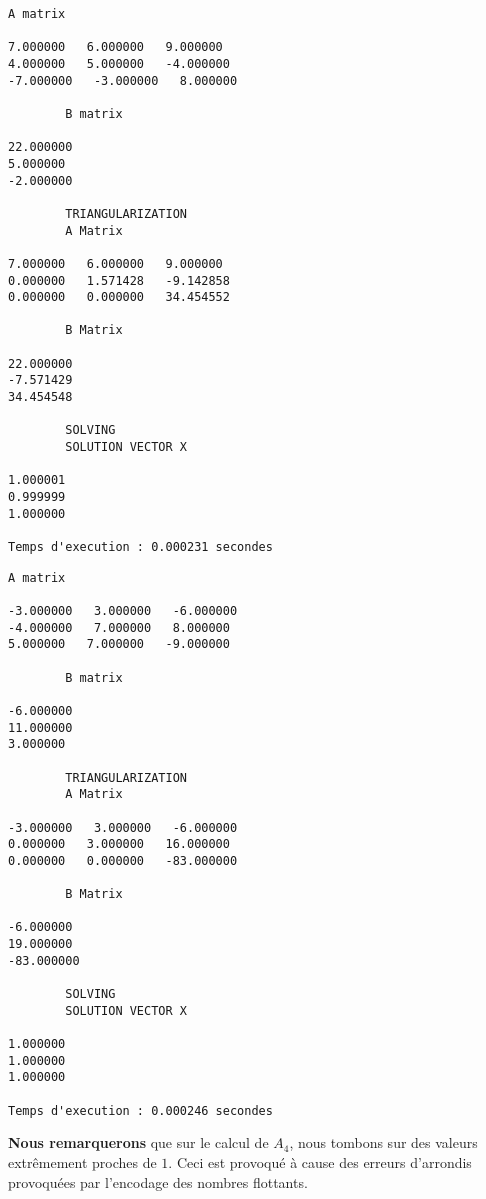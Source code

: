 \begin{lstlisting}[caption={$A_4X=B$} results, basicstyle=\fontsize{8}{10}\selectfont]
		A matrix 

7.000000   6.000000   9.000000   
4.000000   5.000000   -4.000000   
-7.000000   -3.000000   8.000000   

		B matrix 

22.000000   
5.000000   
-2.000000   

		TRIANGULARIZATION 
		A Matrix 

7.000000   6.000000   9.000000   
0.000000   1.571428   -9.142858   
0.000000   0.000000   34.454552   

		B Matrix 

22.000000   
-7.571429   
34.454548   

		SOLVING 
		SOLUTION VECTOR X 

1.000001   
0.999999   
1.000000   

Temps d'execution : 0.000231 secondes
\end{lstlisting}
\begin{lstlisting}[caption={$A_6X=B$} results, basicstyle=\fontsize{8}{10}\selectfont]
		A matrix 

-3.000000   3.000000   -6.000000   
-4.000000   7.000000   8.000000   
5.000000   7.000000   -9.000000   

		B matrix 

-6.000000   
11.000000   
3.000000   

		TRIANGULARIZATION 
		A Matrix 

-3.000000   3.000000   -6.000000   
0.000000   3.000000   16.000000   
0.000000   0.000000   -83.000000   

		B Matrix 

-6.000000   
19.000000   
-83.000000   

		SOLVING 
		SOLUTION VECTOR X 

1.000000   
1.000000   
1.000000   

Temps d'execution : 0.000246 secondes
\end{lstlisting}

\textbf{Nous remarquerons} que sur le calcul de $A_4$, nous tombons sur des valeurs extrêmement proches de $1$. Ceci est provoqué à cause des erreurs d'arrondis provoquées par l'encodage des nombres flottants.     